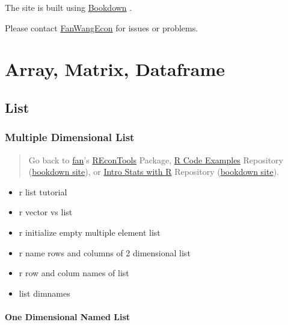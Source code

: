 \documentclass[
]{book}
\providecommand{\tightlist}{%
  \setlength{\itemsep}{0pt}\setlength{\parskip}{0pt}}
\begin{document}
The site is built using \href{https://bookdown.org/}{Bookdown} \citep{R-bookdown}.

Please contact \href{https://fanwangecon.github.io/}{FanWangEcon} for issues or problems.

\hypertarget{array-matrix-dataframe}{%
\chapter{Array, Matrix, Dataframe}\label{array-matrix-dataframe}}

\hypertarget{list}{%
\section{List}\label{list}}

\hypertarget{multiple-dimensional-list}{%
\subsection{Multiple Dimensional List}\label{multiple-dimensional-list}}

\begin{quote}
Go back to \href{http://fanwangecon.github.io/}{fan}'s \href{https://fanwangecon.github.io/REconTools/}{REconTools} Package, \href{https://fanwangecon.github.io/R4Econ/}{R Code Examples} Repository (\href{https://fanwangecon.github.io/R4Econ/bookdown}{bookdown site}), or \href{https://fanwangecon.github.io/Stat4Econ/}{Intro Stats with R} Repository (\href{https://fanwangecon.github.io/Stat4Econ/bookdown}{bookdown site}).
\end{quote}

\begin{itemize}
\tightlist
\item
  r list tutorial
\item
  r vector vs list
\item
  r initialize empty multiple element list
\item
  r name rows and columns of 2 dimensional list
\item
  r row and colum names of list
\item
  list dimnames
\end{itemize}

\hypertarget{one-dimensional-named-list}{%
\subsubsection{One Dimensional Named List}\label{one-dimensional-named-list}}
\end{document}
